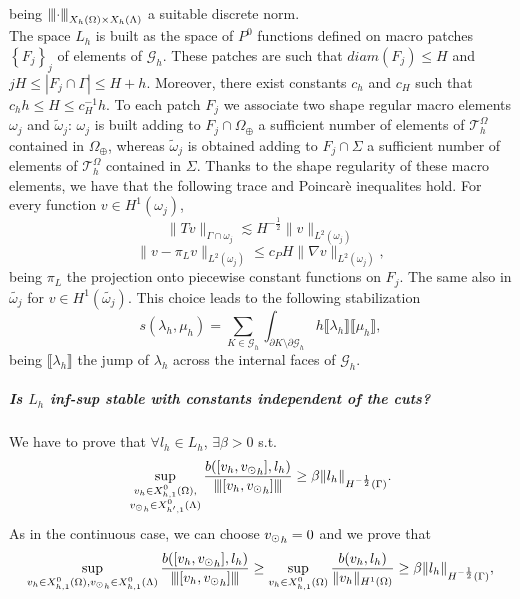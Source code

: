 being ${\left\vert\kern-0.25ex\left\vert\kern-0.25ex\left\vert \cdot  \right\vert\kern-0.25ex\right\vert\kern-0.25ex\right\vert}_{X_h(\Omega)\times X_h(\Lambda) }$ a suitable discrete norm. \\
The space $L_h$ is built as the space of $P^0$ functions defined on macro patches $\left\{ F_j \right\}_j$ of elements of $\mathcal{G}_h$. These patches are such that $diam(F_j)\leq H$ and  $jH\leq |F_j\cap \Gamma|\leq H+h$. Moreover, there exist constants $c_h$ and $c_H$ such that $c_hh\leq H \leq c_H^{-1}h$. To each patch $F_j$ we associate two shape regular macro elements $\omega_j$ and $\tilde{\omega}_j$: $\omega_j$ is built adding to $F_j \cap \Omega_{\oplus}$ a sufficient number of elements of $\mathcal{T}_h^{\Omega}$ contained in $\Omega_{\oplus}$, whereas $\tilde{\omega}_j$ is obtained adding to $F_j \cap\Sigma$ a sufficient number of elements of $\mathcal{T}_h^{\Omega}$ contained in $\Sigma$. Thanks to the shape regularity of these macro elements, we have that the following trace and Poincarè inequalites hold. For every function $v\in H^1(\omega_j)$,
\begin{equation}\label{discr_trace_ineq}
\|Tv\|_{\Gamma\cap \omega_j} \lesssim H^{-\frac 12} \|v\|_{L^2(\omega_j)}
\end{equation}
\begin{equation}\label{disc_poincare_ineq}
\|v- \pi_Lv\|_{L^2(\omega_j)} \leq c_P H \|\nabla v\|_{L^2(\omega_j)},
\end{equation}
being $\pi_L$ the projection onto piecewise constant functions on $F_j$.
The same also in $\tilde{\omega _j}$ for $v\in H^1(\tilde{\omega _j})$. This choice leads to the following stabilization 
\begin{equation*}
s(\lambda_h, \mu_h)= \sum _{K\in \mathcal{G}_h} \int_{\partial K \setminus \partial \mathcal{G}_h} h \llbracket \lambda_h \rrbracket \llbracket \mu_h \rrbracket,
\end{equation*}
being $\llbracket \lambda_h \rrbracket$ the jump of $\lambda_h$ across the internal faces of $\mathcal{G}_h$.
\subparagraph{Is $L_h$ inf-sup stable with constants independent of the cuts?} We have to prove that $\forall l_h \in L_h$, $\exists \beta >0$ s.t.
\begin{equation*}
\sup_{\substack{v_h \in X_{h,1}^0(\Omega),\\ {v_{\odot}}_h \in X_{h',1}^0(\Lambda)}} \frac{b([v_h, {v_{\odot}}_h], l_h)}{{\left\vert\kern-0.25ex\left\vert\kern-0.25ex\left\vert [v_h, {v_{\odot}}_h] \right\vert\kern-0.25ex\right\vert\kern-0.25ex\right\vert}} \geq \beta \|l_h\|_{H^{-\frac 12}(\Gamma)}.
\end{equation*}
As in the continuous case, we can choose ${v_{\odot}}_h=0$ and we prove that
\begin{equation*} 
\sup_{v_h \in X_{h,1}^0(\Omega),\\ {v_{\odot}}_h \in X_{h,1}^0(\Lambda)} \frac{b([v_h, {v_{\odot}}_h], l_h)}{{\left\vert\kern-0.25ex\left\vert\kern-0.25ex\left\vert [v_h, {v_{\odot}}_h] \right\vert\kern-0.25ex\right\vert\kern-0.25ex\right\vert}} \geq  \sup_{v_h \in X_{h,1}^0(\Omega)} \frac{b(v_h, l_h)}{\|v_h\|_{H^1(\Omega)}} \geq \beta \|l_h\|_{H^{-\frac 12}(\Gamma)}, 
\end{equation*}
